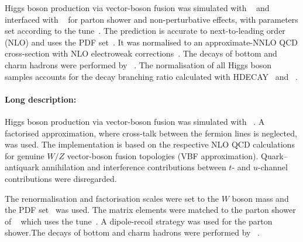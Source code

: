 Higgs boson production via vector-boson fusion was simulated with
\POWHEGBOX[v2]~\cite{Nason:2009ai,Alioli:2010xd,Nason:2004rx,Frixione:2007vw} 
and interfaced with \PYTHIA[8]~\cite{Sjostrand:2014zea} for parton shower and non-perturbative effects,
with parameters set according to the \AZNLO tune~\cite{STDM-2012-23}.
The \POWHEGBOX prediction is accurate to next-to-leading order (NLO) and uses
the \PDFforLHC[15nlo] PDF set~\cite{Butterworth:2015oua}. 
It was normalised to an approximate-NNLO QCD cross-section 
with NLO electroweak corrections~\cite{Ciccolini:2007jr,Ciccolini:2007ec,Bolzoni:2010xr}.
The decays of bottom and charm hadrons were performed by \EVTGEN~\cite{Lange:2001uf}.
The normalisation of all Higgs boson samples accounts for the decay branching ratio calculated 
with \textsc{HDECAY}~\cite{Djouadi:1997yw,Spira:1997dg,Djouadi:2006bz} 
and \PROPHECY~\cite{Bredenstein:2006ha,Bredenstein:2006rh,Bredenstein:2006nk}.


\paragraph{Long description:}

Higgs boson production via vector-boson fusion was simulated with
\POWHEGBOX[v2]~\cite{Nason:2009ai,Alioli:2010xd,Nason:2004rx,Frixione:2007vw}. A factorised approximation, where cross-talk between the
fermion lines is neglected, was used. The implementation is based on the respective NLO QCD calculations for genuine $W/Z$ vector-boson
fusion topologies (VBF approximation). Quark--antiquark annihilation and interference contributions 
between $t$- and $u$-channel contributions were disregarded.

The renormalisation and factorisation scales were set to the $W$ boson mass and the \PDFforLHC[15nlo] PDF set~\cite{Butterworth:2015oua}
was used. The matrix elements were matched to the parton shower of \PYTHIA[8]~\cite{Sjostrand:2014zea} which uses the \AZNLO
tune~\cite{STDM-2012-23}. A dipole-recoil strategy was used for the parton shower.The decays of bottom and charm hadrons
were performed by \EVTGEN~\cite{Lange:2001uf}.%

